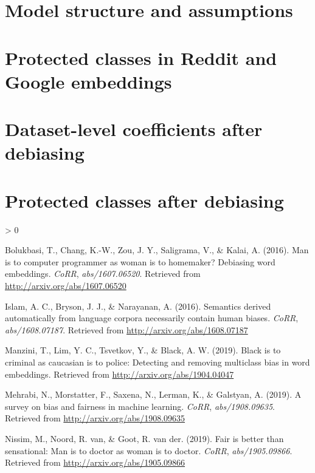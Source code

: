 \documentclass[
  12pt,
]{book}
\newlength{\cslhangindent}
\newenvironment{CSLReferences}[2] %
 {%
  \setlength{\parindent}{0pt}
  \ifodd #1 \everypar{\setlength{\hangindent}{\cslhangindent}}\ignorespaces\fi
  \ifnum #2 > 0
  \setlength{\parskip}{#2\baselineskip}
  \fi
 }%
 {}
\begin{document}
\hypertarget{model-structure-and-assumptions}{%
\section{Model structure and assumptions}\label{model-structure-and-assumptions}}

\hypertarget{protected-classes-in-reddit-and-google-embeddings}{%
\section{Protected classes in Reddit and Google embeddings}\label{protected-classes-in-reddit-and-google-embeddings}}

\hypertarget{dataset-level-coefficients-after-debiasing}{%
\section{Dataset-level coefficients after debiasing}\label{dataset-level-coefficients-after-debiasing}}

\hypertarget{protected-classes-after-debiasing}{%
\section{Protected classes after debiasing}\label{protected-classes-after-debiasing}}

\hypertarget{refs}{}
\begin{CSLReferences}{1}{0}
\leavevmode\hypertarget{ref-Bolukbasi2016Man}{}%
Bolukbasi, T., Chang, K.-W., Zou, J. Y., Saligrama, V., \& Kalai, A. (2016). Man is to computer programmer as woman is to homemaker? Debiasing word embeddings. \emph{CoRR}, \emph{abs/1607.06520}. Retrieved from \url{http://arxiv.org/abs/1607.06520}

\leavevmode\hypertarget{ref-Caliskan2017Semantics}{}%
Islam, A. C., Bryson, J. J., \& Narayanan, A. (2016). Semantics derived automatically from language corpora necessarily contain human biases. \emph{CoRR}, \emph{abs/1608.07187}. Retrieved from \url{http://arxiv.org/abs/1608.07187}

\leavevmode\hypertarget{ref-manzini2019black}{}%
Manzini, T., Lim, Y. C., Tsvetkov, Y., \& Black, A. W. (2019). Black is to criminal as caucasian is to police: Detecting and removing multiclass bias in word embeddings. Retrieved from \url{http://arxiv.org/abs/1904.04047}

\leavevmode\hypertarget{ref-Mehrabi2019Survey}{}%
Mehrabi, N., Morstatter, F., Saxena, N., Lerman, K., \& Galstyan, A. (2019). A survey on bias and fairness in machine learning. \emph{CoRR}, \emph{abs/1908.09635}. Retrieved from \url{http://arxiv.org/abs/1908.09635}

\leavevmode\hypertarget{ref-Nissim2019Fair}{}%
Nissim, M., Noord, R. van, \& Goot, R. van der. (2019). Fair is better than sensational: Man is to doctor as woman is to doctor. \emph{CoRR}, \emph{abs/1905.09866}. Retrieved from \url{http://arxiv.org/abs/1905.09866}

\end{CSLReferences}
\end{document}
